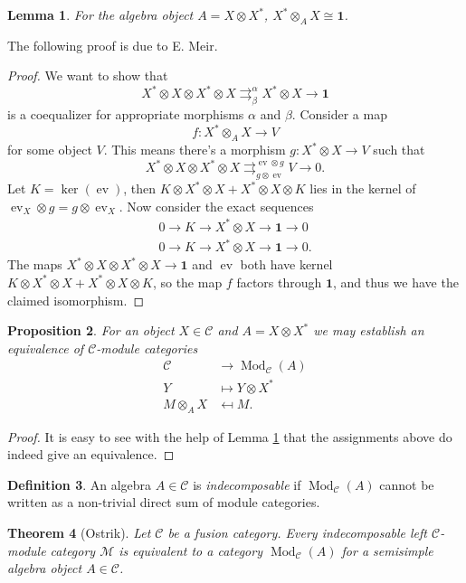 \documentclass[a4paper, 10pt]{book}
\newtheorem{theorem}{Theorem}[chapter]
\newtheorem{Lem}[theorem]{Lemma}
\newtheorem{Prop}[theorem]{Proposition}
\theoremstyle{definition}
\newtheorem{Def}[theorem]{Definition}
\numberwithin{equation}{chapter}
\newcommand\ot{\otimes}
\newcommand\Mod{\operatorname{Mod}}
\newcommand\M{\mathcal{M}}
\newcommand\C{\mathcal C}
\newcommand{\ra}\rightarrow
\newcommand\one{\mathbf{1}}
\newcommand\ev{\operatorname{ev}}
\begin{document}
\begin{Lem}\label{tensoralgebra}
For the algebra object $A=X\ot X^*$, $X^*\ot_A X\cong \one$.
\end{Lem}
The following proof is due to E. Meir.
\begin{proof}
We want to show that \begin{equation}
	X^*\ot X \ot X^* \ot X  \mathrel{\mathop{\rightrightarrows}^{\alpha}_{\beta}} X^*\ot X \ra \one
\end{equation} is a coequalizer for appropriate morphisms $\alpha$ and $\beta$. Consider a map \begin{equation}
	f: X^* \ot_A X \ra V
\end{equation} for some object $V$. This means there's a morphism $g:X^*\ot X\ra V$ such that \begin{equation}
X^*\ot X \ot X^* \ot X 	 \mathrel{\mathop{\rightrightarrows}^{\ev\ot g}_{g\ot \ev}}  V\ra 0.
\end{equation} 
Let $K=\ker (\ev)$, then $K\ot X^*\ot X + X^*\ot X \ot K$ lies in the kernel of $\ev_X\ot g = g\ot \ev_X$. Now consider the exact sequences \begin{align*}
	0\ra K \ra X^*\ot X \ra \one \ra 0\\
	0\ra K \ra X^*\ot X \ra \one \ra 0.
\end{align*} The maps $X^*\ot X \ot X^*\ot X \ra \one$ and $\ev$ both have kernel $K\ot X^*\ot X + X^*\ot X \ot K$, so the map $f$ factors through $\one$, and thus we have the claimed isomorphism.
\end{proof}
\begin{Prop}\label{Cmoduleeqv}\rm
For an object $X\in\C$ and $A=X\ot X^*$ we may establish an equivalence of $\C$-module categories \begin{align}
\C&\ra \Mod_\C(A) \\
Y&\mapsto Y\ot X^*\\
M\ot_A X& \mapsfrom M.
\end{align}
\end{Prop}
\begin{proof}
It is easy to see with the help of Lemma \ref{tensoralgebra} that the assignments above do indeed give an equivalence. 
\end{proof}
\begin{Def}
An algebra $A\in \C$ is \textit{indecomposable} if $\Mod_\C(A)$ cannot be written as a non-trivial direct sum of module categories. 
\end{Def}
\begin{theorem}[Ostrik]\label{Ostrik}
Let $\C$ be a fusion category. Every indecomposable left $\C$-module category $\M$ is equivalent to a category $\Mod_\C(A)$ for a semisimple algebra object $A\in\C$.
\end{theorem}
\end{document}

